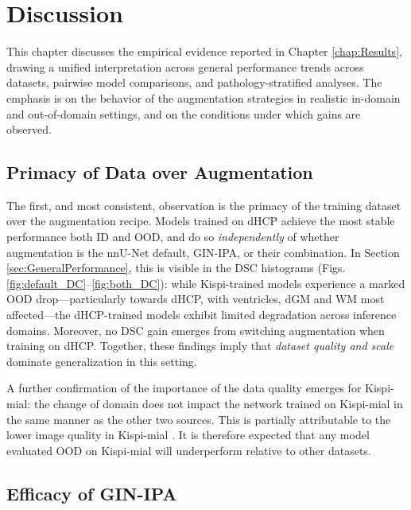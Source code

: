 \chapter{Discussion} \label{chap:Discussion}
\vspace{1cm}

This chapter discusses the empirical evidence reported in Chapter \ref{chap:Results}, drawing a unified interpretation across general performance trends across datasets, pairwise model comparisons, and pathology-stratified analyses. The emphasis is on the behavior of the augmentation strategies in realistic in-domain and out-of-domain settings, and on the conditions under which gains are observed.

\section{Primacy of Data over Augmentation}
The first, and most consistent, observation is the primacy of the training dataset over the augmentation recipe. Models trained on dHCP achieve the most stable performance both ID and OOD, and do so \emph{independently} of whether augmentation is the nnU-Net default, GIN-IPA, or their combination. In Section \ref{sec:GeneralPerformance}, this is visible in the DSC histograms (Figs.\,\ref{fig:default_DC}--\ref{fig:both_DC}): while Kispi-trained models experience a marked OOD drop---particularly towards dHCP, with ventricles, dGM and WM most affected---the dHCP-trained models exhibit limited degradation across inference domains. Moreover, no DSC gain emerges from switching augmentation when training on dHCP. Together, these findings imply that \emph{dataset quality and scale} dominate generalization in this setting.

A further confirmation of the importance of the data quality emerges for Kispi-mial: the change of domain does not impact the network trained on Kispi-mial in the same manner as the other two sources. This is partially attributable to the lower image quality in Kispi-mial \cite{FeTA2021_review}. It is therefore expected that any model evaluated OOD on Kispi-mial will underperform relative to other datasets.

\section{Efficacy of GIN-IPA}

